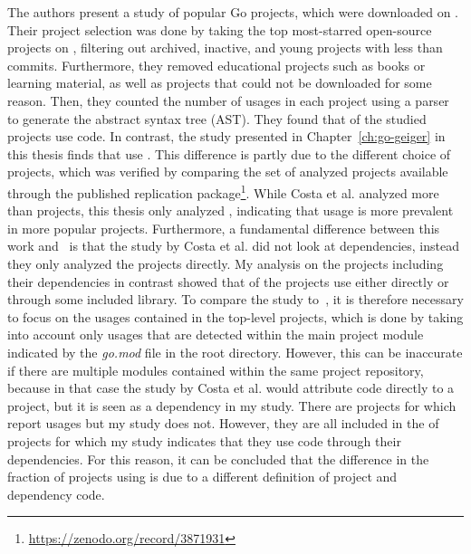 The authors present a study of  popular Go projects, which were downloaded on
.
Their project selection was done by taking the top  most-starred open-source projects on \github{},
filtering out archived, inactive, and young projects with less than  commits.
Furthermore, they removed educational projects such as books or learning material, as well as projects that could not be
downloaded for some reason.
Then, they counted the number of \unsafe{} usages in each project using a parser to generate the abstract syntax tree
(\acrshort{AST}).
They found that  of the studied projects use \unsafe{} code.
In contrast, the study presented in Chapter~\ref{ch:go-geiger} in this thesis finds that \percentageUnsafeProjects{}
use \unsafe{}.
This difference is partly due to the different choice of projects, which was verified by comparing the set of analyzed
projects available through the published replication package\footnote{\url{https://zenodo.org/record/3871931}}.
While Costa et al. analyzed more than  projects, this thesis only analyzed \projsAnalyzed{}, indicating
that \unsafe{} usage is more prevalent in more popular projects.
Furthermore, a fundamental difference between this work and~\cite{costa2020} is that the study by Costa et al. did not
look at dependencies, instead they only analyzed the projects directly.
My analysis on the projects including their dependencies in contrast showed that
\percentageUnsafeTransitiveWithDependencies{} of the projects use \unsafe{} either directly or through some included
library.
To compare the study to~\cite{costa2020}, it is therefore necessary to focus on the \unsafe{} usages contained in the
top-level projects, which is done by taking into account only usages that are detected within the main project module
indicated by the \textit{go.mod} file in the root directory.
However, this can be inaccurate if there are multiple modules contained within the same project repository, because in
that case the study by Costa et al. would attribute code directly to a project, but it is seen as a dependency in my
study.
There are  projects for which~\cite{costa2020} report \unsafe{} usages  but my study does not.
However, they are all included in the \percentageUnsafeTransitiveWithDependencies{} of projects for which my study
indicates that they use \unsafe{} code through their dependencies.
For this reason, it can be concluded that the difference in the fraction of projects using \unsafe{} is due to a
different definition of project and dependency code.

